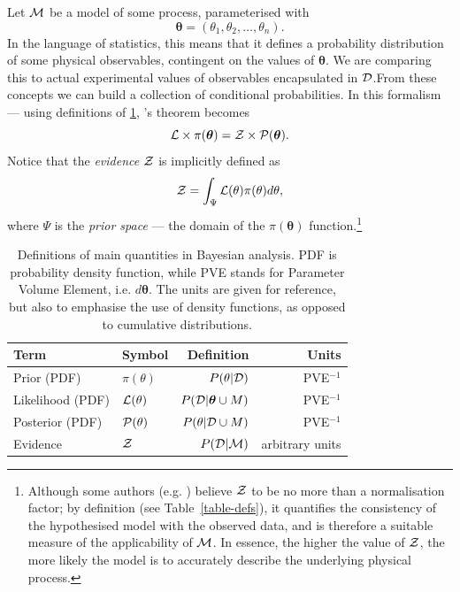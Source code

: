 \documentclass[usenatbib]{mnras}
\begin{document}
Let \({\cal M}\) be a model of some process, parameterised with
\[\bm{\theta} = (\theta_{1}, \theta_{2}, \ldots ,
   \theta_{n}).\] In the language of statistics, this means that it
defines a probability distribution of some physical observables,
contingent on the values of \(\bm{\theta}\). We are comparing
this to actual experimental values of observables encapsulated in
\({\cal D}\).From these concepts we can build a collection of
conditional probabilities. In this formalism --- using definitions of 
\cref{table-defs}, \citeauthor{1763}'s theorem becomes
\begin{equation}\label{eq:bayes} 
 {\cal L} \times \pi (\bm{\theta}) = {\cal Z}\times {\cal P} (\bm{\theta}).
\end{equation}
Notice that the \emph{evidence} \({\cal Z}\) is implicitly defined as
\begin{equation}\label{eq:def-z}
 {\cal Z} = \int_{\Psi} {\cal L}(\theta) \pi(\theta) d\theta, 
\end{equation}
where \(\Psi\) is the \emph{prior space} --- the domain of the
\(\pi(\bm{\theta})\) function.\footnote{Although some authors (e.g. \citeauthor{jeffreys2010scientific}) believe \({\cal Z}\) to be no more than a normalisation factor; by definition (see Table~\vref{table-defs}), it quantifies the consistency of the hypothesised model with the observed data, and is therefore a suitable measure of the applicability of \({\cal M}\). In essence, the higher the value of \({\cal Z}\), the more likely the model is to accurately describe the underlying physical process.}

\begin{table}
\caption{Definitions of main quantities in Bayesian analysis. PDF is probability density function, while PVE stands for Parameter Volume Element, i.e. \(d \bm{\theta}\). The units are given for reference, but also to emphasise the use of density functions, as opposed to cumulative distributions.  \label{table-defs}}
\centering
\begin{tabular}{llrr}
\textbf{\textbf{Term}} & \textbf{\textbf{Symbol}} & \textbf{\textbf{Definition}} & \textbf{\textbf{Units}}\\
\hline
Prior (PDF) & \(\pi(\theta)\) & \(P ( \theta  \vert {\cal D})\) & PVE\(^{-1}\)\\
Likelihood (PDF) & \({\cal L}(\theta)\) & \(P ( {\cal D} \vert \bm{\theta} \cup M)\) & PVE\(^{-1}\)\\
Posterior (PDF) & \({\cal P}(\theta)\) & \(P ( \theta \vert {\cal D} \cup M)\) & PVE\(^{-1}\)\\
Evidence & \({\cal Z}\) & \(P ( {\cal D} \vert {\cal M})\) & arbitrary units\\
\end{tabular}
\end{table}
\end{document}
